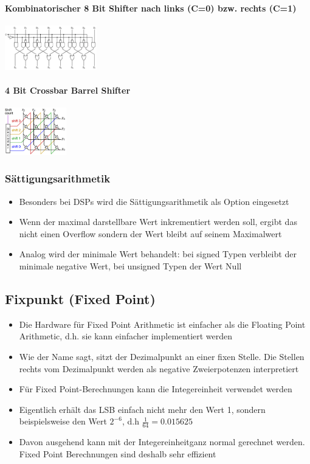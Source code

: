 \begin{multicols}{2}
	\paragraph{Kombinatorischer 8 Bit Shifter nach links (C=0) bzw. rechts (C=1)}
	\includegraphics[width=0.3\textwidth]{images/Arithmetik/Shifter_1}

	\paragraph{4 Bit Crossbar Barrel Shifter}
	\includegraphics[width=0.2\textwidth]{images/Arithmetik/Shifter_2}
\end{multicols}

\subsubsection{Sättigungsarithmetik}
\begin{itemize}
	\item Besonders bei DSPs wird die Sättigungsarithmetik als Option eingesetzt
	\item Wenn der maximal darstellbare Wert inkrementiert werden soll, ergibt das nicht einen Overflow sondern der Wert bleibt auf seinem Maximalwert
	\item Analog wird der minimale Wert behandelt: bei signed Typen verbleibt der minimale negative Wert, bei unsigned Typen der Wert Null
\end{itemize}

\subsection{Fixpunkt (Fixed Point)}
\begin{itemize}
	\item Die Hardware für Fixed Point Arithmetic ist einfacher als die Floating Point Arithmetic, d.h. sie kann einfacher implementiert werden
	\item Wie der Name sagt, sitzt der Dezimalpunkt an einer fixen Stelle. Die Stellen rechts vom Dezimalpunkt werden als negative Zweierpotenzen interpretiert
	\item  Für Fixed Point-Berechnungen kann die Integereinheit verwendet werden
	\item Eigentlich erhält das LSB einfach nicht mehr den Wert 1, sondern beispielsweise den Wert $2^{-6}$, d.h $\frac{1}{64} = 0.015625$
	\item  Davon ausgehend kann mit der Integereinheitganz normal gerechnet werden.
	Fixed Point Berechnungen sind deshalb sehr effizient
\end{itemize}

